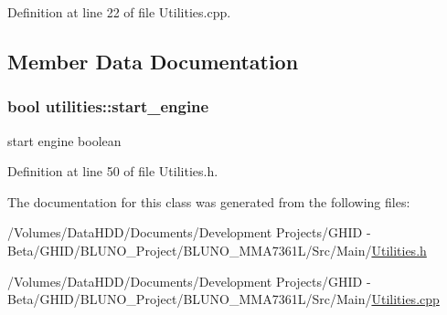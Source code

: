 \-Definition at line 22 of file \-Utilities.\-cpp.



\subsection{\-Member \-Data \-Documentation}
\hypertarget{classutilities_a00ad17c59af67ff895854c2510407513}{
\subsubsection[{start\-\_\-engine}]{\setlength{\rightskip}{0pt plus 5cm}bool {\bf utilities\-::start\-\_\-engine}}}\label{classutilities_a00ad17c59af67ff895854c2510407513}


start engine boolean 



\-Definition at line 50 of file \-Utilities.\-h.



\-The documentation for this class was generated from the following files\-:\begin{DoxyCompactItemize}
\item 
/\-Volumes/\-Data\-H\-D\-D/\-Documents/\-Development Projects/\-G\-H\-I\-D -\/ Beta/\-G\-H\-I\-D/\-B\-L\-U\-N\-O\-\_\-\-Project/\-B\-L\-U\-N\-O\-\_\-\-M\-M\-A7361\-L/\-Src/\-Main/\hyperlink{_utilities_8h}{\-Utilities.\-h}\item 
/\-Volumes/\-Data\-H\-D\-D/\-Documents/\-Development Projects/\-G\-H\-I\-D -\/ Beta/\-G\-H\-I\-D/\-B\-L\-U\-N\-O\-\_\-\-Project/\-B\-L\-U\-N\-O\-\_\-\-M\-M\-A7361\-L/\-Src/\-Main/\hyperlink{_utilities_8cpp}{\-Utilities.\-cpp}\end{DoxyCompactItemize}
